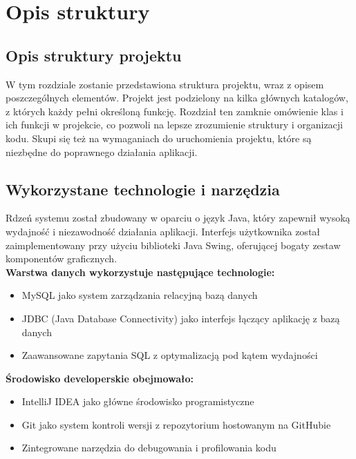 \chapter{Opis struktury}
\label{chap:struk}

\section*{Opis struktury projektu}
W tym rozdziale zostanie przedstawiona struktura projektu, wraz z opisem poszczególnych elementów. Projekt jest podzielony na kilka głównych katalogów, z których każdy pełni określoną funkcję.
Rozdział ten zamknie omówienie klas i ich funkcji w projekcie, co pozwoli na lepsze zrozumienie struktury i organizacji kodu. Skupi się też na wymaganiach do uruchomienia projektu, które są niezbędne do poprawnego działania aplikacji.

\section{Wykorzystane technologie i narzędzia}
Rdzeń systemu został zbudowany w oparciu o język Java, który zapewnił wysoką wydajność i niezawodność działania aplikacji. Interfejs użytkownika został zaimplementowany przy użyciu biblioteki Java Swing, oferującej bogaty zestaw komponentów graficznych.\\

\textbf{Warstwa danych wykorzystuje następujące technologie:}

\begin{itemize}

\item MySQL jako system zarządzania relacyjną bazą danych

\item JDBC (Java Database Connectivity) jako interfejs łączący aplikację z bazą danych

\item Zaawansowane zapytania SQL z optymalizacją pod kątem wydajności\\

\end{itemize}



\textbf{Środowisko developerskie obejmowało:}


\begin{itemize}

\item IntelliJ IDEA jako główne środowisko programistyczne

\item Git jako system kontroli wersji z repozytorium hostowanym na GitHubie

\item Zintegrowane narzędzia do debugowania i profilowania kodu\\

\end{itemize}



